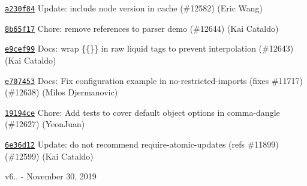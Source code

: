 \begin{DoxyItemize}
\item \href{https://github.com/eslint/eslint/commit/a230f8404e4f2423dd79378b065d24c12776775b}{\texttt{ {\ttfamily a230f84}}} Update\+: include node version in cache (\#12582) (Eric Wang)
\item \href{https://github.com/eslint/eslint/commit/8b65f175dfb4fac11ed7184537be400ed14996fb}{\texttt{ {\ttfamily 8b65f17}}} Chore\+: remove references to parser demo (\#12644) (Kai Cataldo)
\item \href{https://github.com/eslint/eslint/commit/e9cef99e6ebec1faefdb576ca597e81ae4f04afd}{\texttt{ {\ttfamily e9cef99}}} Docs\+: wrap \{\{\}\} in raw liquid tags to prevent interpolation (\#12643) (Kai Cataldo)
\item \href{https://github.com/eslint/eslint/commit/e70745325ff9e085acc6843dd8bfae5550645d4f}{\texttt{ {\ttfamily e707453}}} Docs\+: Fix configuration example in no-\/restricted-\/imports (fixes \#11717) (\#12638) (Milos Djermanovic)
\item \href{https://github.com/eslint/eslint/commit/19194cec724e016df02376bbeae31171be6f0bdf}{\texttt{ {\ttfamily 19194ce}}} Chore\+: Add tests to cover default object options in comma-\/dangle (\#12627) (Yeon\+Juan)
\item \href{https://github.com/eslint/eslint/commit/6e36d12d95e76022172fd0ec8a5e85c22fde6a8a}{\texttt{ {\ttfamily 6e36d12}}} Update\+: do not recommend require-\/atomic-\/updates (refs \#11899) (\#12599) (Kai Cataldo)
\end{DoxyItemize}

v6.. -\/ November 30, 2019


